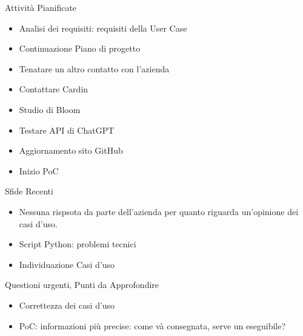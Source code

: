 \documentclass{beamer}
\begin{document}
\begin{frame}
    \begin{block}{Attività Pianificate}
        \begin{itemize}
            \item Analisi dei requisiti: requisiti della User Case
            \item Continuazione Piano di progetto
            \item Tenatare un altro contatto con l'azienda
            \item Contattare Cardin
            \item Studio di Bloom
            \item Testare API di ChatGPT
            \item Aggiornamento sito GitHub
            \item Inizio PoC
        \end{itemize}
    \end{block}
\end{frame}

\begin{frame}
    \begin{alertblock}{Sfide Recenti}
        \begin{itemize}
            \item Nessuna rispsota da parte dell'azienda per quanto riguarda un'opinione dei casi d'uso.
            \item Script Python: problemi tecnici
            \item Individuazione Casi d'uso
        \end{itemize}
    \end{alertblock}
\end{frame}

\begin{frame}
    \begin{exampleblock}{Questioni urgenti, Punti da Approfondire}
        \begin{itemize}
            \item Correttezza dei casi d'uso
            \item PoC: informazioni più precise: come và consegnata, serve un eseguibile?
        \end{itemize}
    \end{exampleblock}
\end{frame}
\end{document}
